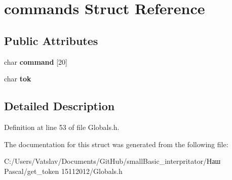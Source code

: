 \hypertarget{structcommands}{\section{commands Struct Reference}
\label{structcommands}
}
\subsection*{Public Attributes}
\begin{DoxyCompactItemize}
\item 
\hypertarget{structcommands_a8a9b33c07bbe0d690879af7acc1e0c67}{char {\bfseries command} \mbox{[}20\mbox{]}}\label{structcommands_a8a9b33c07bbe0d690879af7acc1e0c67}

\item 
\hypertarget{structcommands_a142499c28c9e2b02a0cc72bd9f325a00}{char {\bfseries tok}}\label{structcommands_a142499c28c9e2b02a0cc72bd9f325a00}

\end{DoxyCompactItemize}


\subsection{Detailed Description}


Definition at line 53 of file Globals.\-h.



The documentation for this struct was generated from the following file\-:\begin{DoxyCompactItemize}
\item 
C\-:/\-Users/\-Vatslav/\-Documents/\-Git\-Hub/small\-Basic\-\_\-interpritator/Наш Pascal/get\-\_\-token 15112012/Globals.\-h\end{DoxyCompactItemize}
